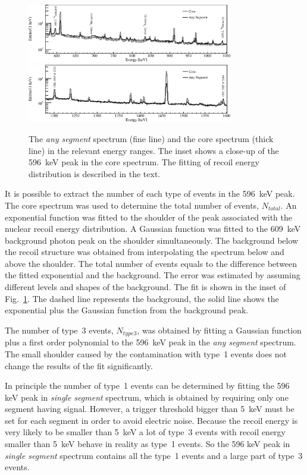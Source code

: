 \begin{figure}[tbhp]
  \centering
  \includegraphics[width=0.8\textwidth,clip]{spe_casp}
  \includegraphics[width=0.8\textwidth,clip]{spe_cas2p}
  \caption{The \emph{any segment} spectrum (fine line) and the core
    spectrum (thick line) in the relevant energy ranges. The inset
    shows a close-up of the 596~keV peak in the core spectrum. The
    fitting of recoil energy distribution is described in the text.}
  \label{fig:neu:cas}
\end{figure}


It is possible to extract the number of each type of events in the 596~keV peak. The core spectrum was used to determine the total number of events, $N_{total}$. An exponential function was fitted to the shoulder of the peak associated with the nuclear recoil energy distribution. A Gaussian function was fitted to the 609~keV background photon peak on the shoulder simultaneously. The background below the recoil structure was obtained from interpolating the spectrum below and above the shoulder. The total number of events equals to the difference between the fitted exponential and the background. The error was estimated by assuming different levels and shapes of the background. The fit is shown in the inset of Fig.~\ref{fig:neu:cas}. The dashed line represents the background, the solid line shows the exponential plus the Gaussian function from the background peak.

The number of type~3 events, $N_{type3}$, was obtained by fitting a
Gaussian function plus a first order polynomial to the 596~keV peak in
the \emph{any segment} spectrum. The small shoulder caused by the
contamination with type~1 events does not change the results of the
fit significantly.

In principle the number of type~1 events can be determined by fitting
the 596 keV peak in \emph{single segment} spectrum, which is obtained
by requiring only one segment having signal. However, a trigger
threshold bigger than 5~keV must be set for each segment in order to
avoid electric noise. Because the recoil energy is very likely to be
smaller than 5~keV a lot of type~3 events with recoil energy smaller
than 5~keV behave in reality as type~1 events. So the 596 keV peak in
\emph{single segment} spectrum contains all the type~1 events and a
large part of type~3 events.

